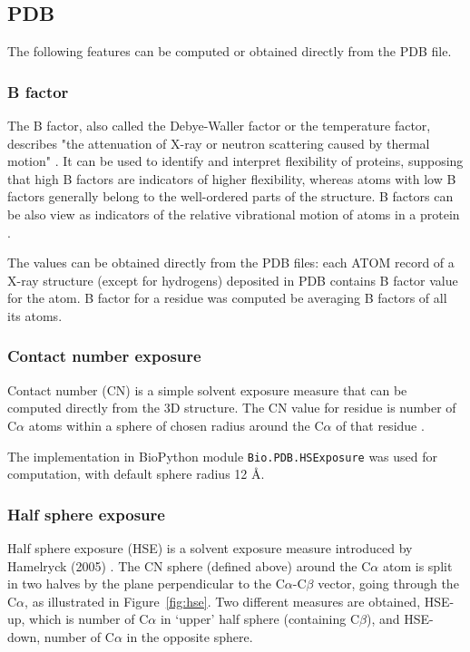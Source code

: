 \subsection{PDB}

The following features can be computed or obtained directly from the PDB file.

\subsubsection{B factor}

The B factor, also called the Debye-Waller factor or the temperature factor, describes "the attenuation of X-ray or neutron scattering caused by thermal motion" \cite{bfactor}. It can be used to identify and interpret flexibility of proteins, supposing that high B factors are indicators of higher flexibility, whereas atoms with low B factors generally belong to the well-ordered parts of the structure. B factors can be also view as indicators of the relative vibrational motion of atoms in a protein \cite{bfactor}.

The values can be obtained directly from the PDB files: each ATOM record of a X-ray structure (except for hydrogens) deposited in PDB contains B factor value for the atom. B factor for a residue was computed be averaging B factors of all its atoms. 

\subsubsection{Contact number exposure}

Contact number (CN) is a simple solvent exposure measure that can be computed directly from the 3D structure. The CN value for residue is number of C$\alpha$ atoms within a sphere of chosen radius around the C$\alpha$ of that residue \cite{cn}.

The implementation in BioPython module \texttt{Bio.PDB.HSExposure} was used for computation, with default sphere radius 12 {\AA}.


\subsubsection{Half sphere exposure}

Half sphere exposure (HSE) is a solvent exposure measure introduced by Hamelryck (2005) \cite{hse}. The CN sphere (defined above) around the C$\alpha$ atom is split in two halves by the plane perpendicular to the C$\alpha$-C$\beta$ vector, going through the C$\alpha$, as illustrated in Figure~\ref{fig:hse}. Two different measures are obtained, HSE-up, which is number of C$\alpha$ in `upper' half sphere (containing C$\beta$), and HSE-down, number of C$\alpha$ in the opposite sphere.


